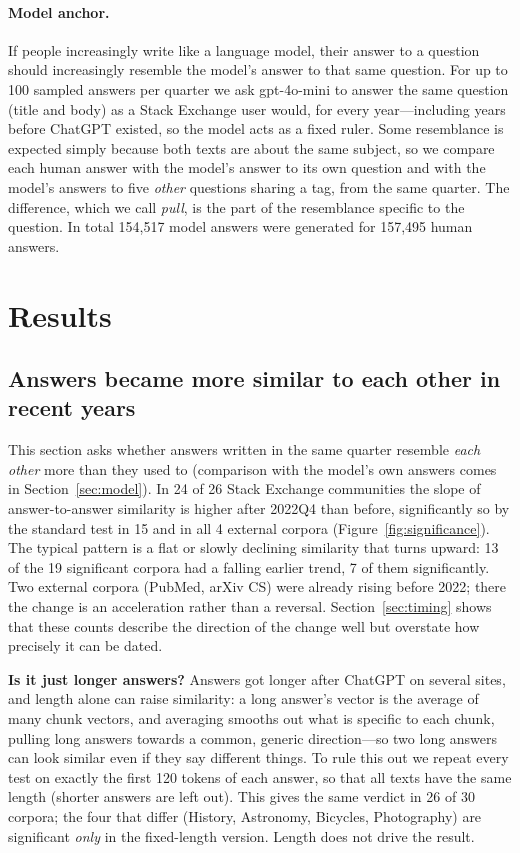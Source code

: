 \documentclass[11pt]{article}
\begin{document}
\paragraph{Model anchor.} If people increasingly write like a language model, their answer to a
question should increasingly resemble the model's answer to that same question. For up to 100
sampled answers per quarter we ask gpt-4o-mini to answer the same question (title and body) as a
Stack Exchange user would, for every year---including years before ChatGPT existed, so the model acts
as a fixed ruler. Some resemblance is expected simply because both texts are about the same subject,
so we compare each human answer with the model's answer to its own question and with the model's
answers to five \emph{other} questions sharing a tag, from the same quarter. The difference, which
we call \emph{pull}, is the part of the resemblance specific to the question. In total 154,517 model
answers were generated for 157,495 human answers.

\section{Results}

\subsection{Answers became more similar to each other in recent years}
\label{sec:alike}

This section asks whether answers written in the same quarter resemble \emph{each other} more than
they used to (comparison with the model's own answers comes in Section~\ref{sec:model}). In 24 of 26
Stack Exchange communities the slope of answer-to-answer similarity is higher after 2022Q4 than
before, significantly so by the standard test in 15 and in all 4 external corpora
(Figure~\ref{fig:significance}). The typical pattern is a flat or slowly declining similarity that
turns upward: 13 of the 19 significant corpora had a falling earlier trend, 7 of them significantly.
Two external corpora (PubMed, arXiv CS) were already rising before 2022; there the change is an
acceleration rather than a reversal. Section~\ref{sec:timing} shows that these counts describe the
direction of the change well but overstate how precisely it can be dated.

\textbf{Is it just longer answers?} Answers got longer after ChatGPT on several sites, and length
alone can raise similarity: a long answer's vector is the average of many chunk vectors, and
averaging smooths out what is specific to each chunk, pulling long answers towards a common,
generic direction---so two long answers can look similar even if they say different things. To rule
this out we repeat every test on exactly the first 120 tokens of each answer, so that all texts have
the same length (shorter answers are left out). This gives the same verdict in 26 of 30 corpora; the
four that differ (History, Astronomy, Bicycles, Photography) are significant \emph{only} in the
fixed-length version. Length does not drive the result.
\end{document}
